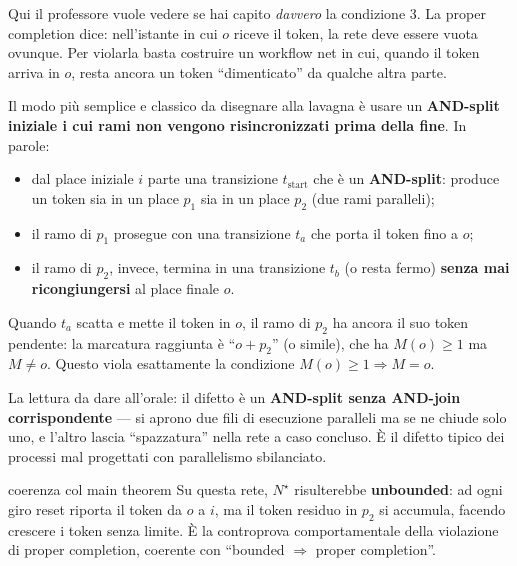 Qui il professore vuole vedere se hai capito \emph{davvero} la condizione 3. La proper completion dice: nell'istante in cui $o$ riceve il token, la rete deve essere vuota ovunque. Per violarla basta costruire un workflow net in cui, quando il token arriva in $o$, resta ancora un token ``dimenticato'' da qualche altra parte.

Il modo più semplice e classico da disegnare alla lavagna è usare un \textbf{AND-split iniziale i cui rami non vengono risincronizzati prima della fine}. In parole:

\begin{itemize}
  \item dal place iniziale $i$ parte una transizione $t_{\text{start}}$ che è un \textbf{AND-split}: produce un token sia in un place $p_1$ sia in un place $p_2$ (due rami paralleli);
  \item il ramo di $p_1$ prosegue con una transizione $t_a$ che porta il token fino a $o$;
  \item il ramo di $p_2$, invece, termina in una transizione $t_b$ (o resta fermo) \textbf{senza mai ricongiungersi} al place finale $o$.
\end{itemize}

Quando $t_a$ scatta e mette il token in $o$, il ramo di $p_2$ ha ancora il suo token pendente: la marcatura raggiunta è ``$o + p_2$'' (o simile), che ha $M(o) \ge 1$ ma $M \ne o$. Questo viola esattamente la condizione $M(o)\ge 1 \Rightarrow M=o$.

La lettura da dare all'orale: il difetto è un \textbf{AND-split senza AND-join corrispondente} — si aprono due fili di esecuzione paralleli ma se ne chiude solo uno, e l'altro lascia ``spazzatura'' nella rete a caso concluso. È il difetto tipico dei processi mal progettati con parallelismo sbilanciato.

\begin{attenzione}{coerenza col main theorem}
Su questa rete, $N^\star$ risulterebbe \textbf{unbounded}: ad ogni giro reset riporta il token da $o$ a $i$, ma il token residuo in $p_2$ si accumula, facendo crescere i token senza limite. È la controprova comportamentale della violazione di proper completion, coerente con ``bounded $\Rightarrow$ proper completion''.
\end{attenzione}
